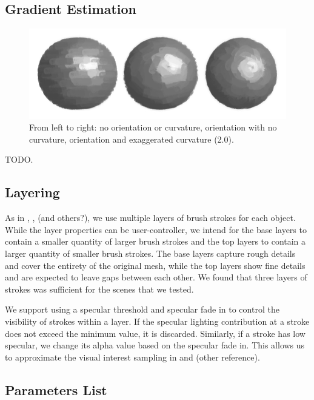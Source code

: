 \documentclass[conference]{acmsiggraph}
\begin{document}
\subsection{Gradient Estimation}

\begin{figure}[ht]
  \centering
  \includegraphics[width=6.0in]{images/sphere_rotation_curve}
  \caption{From left to right: no orientation or curvature, orientation with
           no curvature, orientation and exaggerated curvature (2.0).}
\end{figure}

TODO.

\subsection{Layering}

As in \cite{Hertzmann:1998:PRC:280814.280951},
\cite{Meier:1996:PRA:237170.237288}, (and others?), we use multiple layers of
brush strokes for each object. While the layer properties can be
user-controller, we intend for the base layers to contain a smaller quantity of
larger brush strokes and the top layers to contain a larger quantity of smaller
brush strokes. The base layers capture rough details and cover the entirety of
the original mesh, while the top layers show fine details and are expected to
leave gaps between each other. We found that three layers of strokes was
sufficient for the scenes that we tested.

We support using a specular threshold and specular fade in to control the
visibility of strokes within a layer. If the specular lighting contribution at
a stroke does not exceed the minimum value, it is discarded. Similarly, if a
stroke has low specular, we change its alpha value based on the specular fade
in. This allows us to approximate the visual interest sampling in
\cite{Hertzmann:1998:PRC:280814.280951} and (other reference).


\subsection{Parameters List}
\end{document}

